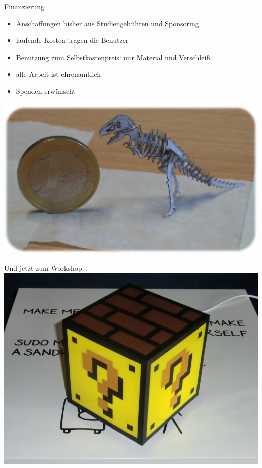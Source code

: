 \documentclass[t]{beamer}
\begin{document}
\begin{frame}{Finanzierung}
\renewcommand{\baselinestretch}{1.5}
	\begin{itemize}
		\item Anschaffungen bisher aus Studiengebühren und Sponsoring\\[.5em]
		\item laufende Kosten tragen die Benutzer
		\item Benutzung zum Selbstkostenpreis: nur Material und Verschleiß\\[.5em]
		\item alle Arbeit ist ehrenamtlich
		\item Spenden erwünscht
	\end{itemize}
\vspace{-2em}
\mbox{\hspace{12em}\includegraphics[width=.6\textwidth]{img/tinysaur.jpg}}
\end{frame}

\begin{frame}{Und jetzt zum Workshop...}
\centering
\includegraphics[width=.7\textwidth]{img/lamp1.jpg} 
\end{frame}
\end{document}
